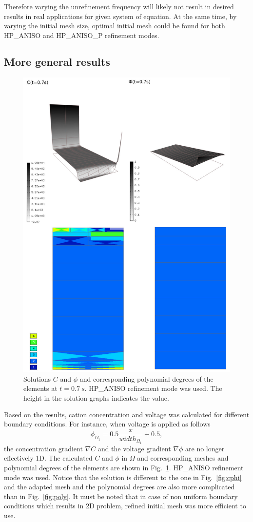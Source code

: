 Therefore varying the unrefinement frequency will
likely not result in desired results in real applications for given system of equation.
At the same time, by varying the initial mesh size, optimal initial mesh could be found
for both HP\_ANISO and HP\_ANISO\_P refinement modes.
	 
\subsection{More general results}
\begin{figure}[!ht]
  \begin{centering}
  \includegraphics[width=.75\columnwidth]{cphiorders}
  \caption{\label{fig:cphi-orders} Solutions $C$ and $\phi$
  and corresponding polynomial degrees of the elements at
  $t=0.7\ s$. HP\_ANISO refinement mode was used. The height
  in the solution graphs indicates the value.}
  \end{centering}
\end{figure}

Based on the results, cation concentration and voltage was calculated
for different boundary conditions.
For instance, when voltage is applied as follows
\begin{equation}
  \phi_{\Omega_1}=0.5\frac{x}{width_{\Omega_1}}+0.5,
\end{equation}
the concentration gradient $\nabla C$ and the voltage gradient $\nabla \phi$ are no
longer effectively 1D.
The calculated $C$ and $\phi$ in $\Omega$ and corresponding meshes and polynomial
degrees of the elements are shown in Fig.~\ref{fig:cphi-orders}.
HP\_ANISO refinement mode was used. Notice that the solution
is different to the one in Fig.~\ref{fig:cphi} and the adapted mesh and the
polynomial degrees are also more complicated than in Fig.~\ref{fig:poly}.
It must be noted that in case of non uniform boundary conditions which
results in 2D problem, refined initial mesh was more efficient to use.
